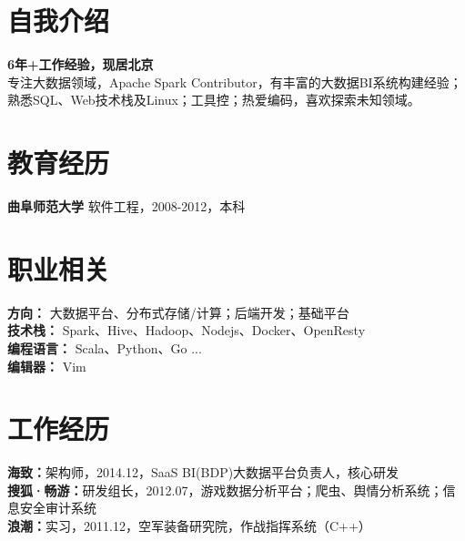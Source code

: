 \documentclass[UTF8,margin,line]{res}
\begin{document}

\begin{resume}

\section{\sc 自我介绍}
\textbf{6年+工作经验，现居北京} \\
专注大数据领域，Apache Spark Contributor，有丰富的大数据BI系统构建经验； \\
熟悉SQL、Web技术栈及Linux；工具控；热爱编码，喜欢探索未知领域。

\section{\sc 教育经历}
\textbf{曲阜师范大学} 软件工程，2008-2012，本科

\section{\sc 职业相关}
\textbf{方向：} 大数据平台、分布式存储/计算；后端开发；基础平台 \\
\textbf{技术栈：} Spark、Hive、Hadoop、Nodejs、Docker、OpenResty \\
\textbf{编程语言：} Scala、Python、Go ... \\
\textbf{编辑器：} Vim

\section{\sc 工作经历}
\textbf{海致：}架构师，2014.12，SaaS BI(BDP)大数据平台负责人，核心研发 \\
\textbf{搜狐·畅游：}研发组长，2012.07，游戏数据分析平台；爬虫、舆情分析系统；信息安全审计系统 \\
\textbf{浪潮：}实习，2011.12，空军装备研究院，作战指挥系统（C++）


\end{resume}
\end{document}
